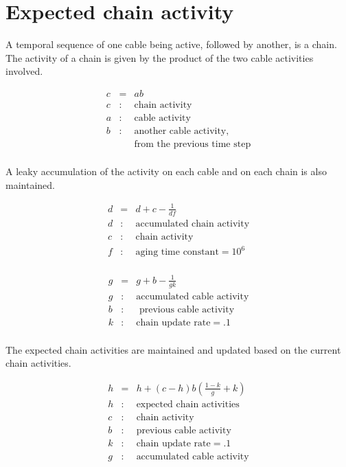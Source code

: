\documentclass[oneside,twocolumn]{article}
\begin{document}
\section*{\color{copper} Expected chain activity}

A temporal sequence of one cable being active, followed by another, is a chain. The activity of a chain is given by the product of the two cable activities involved.

\begin{eqnarray*}
c &= & ab\\ 
c &:& \mbox{chain activity} \\
a &:& \mbox{cable activity} \\
b &:& \mbox{another cable activity,}\\
&& \mbox{from the previous time step}\\
\end{eqnarray*}

A leaky accumulation of the activity on each cable and on each chain is also maintained.

\begin{eqnarray*}
d &= & d + c - \frac{1}{df}\\ 
d &:& \mbox{accumulated chain activity} \\
c &:& \mbox{chain activity} \\
f &:& \mbox{aging time constant} = 10^6 \\
\end{eqnarray*}

\begin{eqnarray*}
g &= & g + b - \frac{1}{gk}\\ 
g &:& \mbox{accumulated cable activity} \\
b &:& \mbox{ previous cable activity} \\
k &:& \mbox{chain update rate} = .1 \\
\end{eqnarray*}

The expected chain activities are maintained and updated based on the current chain activities. 

\begin{eqnarray*}
h &= & h + (c-h)b \left ( \frac{1 - k}{g} + k \right)\\ 
h &:& \mbox{expected chain activities} \\
c &:& \mbox{chain activity} \\
b &:& \mbox{previous cable activity} \\
k &:& \mbox{chain update rate} = .1 \\
g &:& \mbox{accumulated cable activity} \\
\end{eqnarray*}
\end{document}
